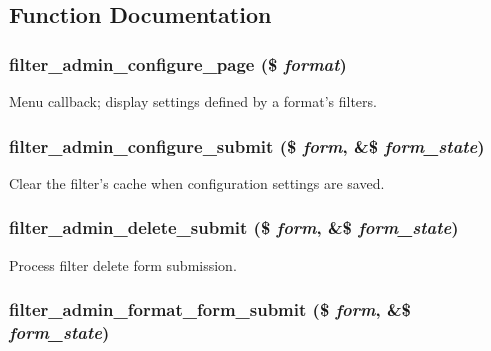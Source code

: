 \subsection{Function Documentation}
\hypertarget{filter_8admin_8inc_73c7cd94e9aa604197745aeda599bf43}{
\subsubsection[{filter\_\-admin\_\-configure\_\-page}]{\setlength{\rightskip}{0pt plus 5cm}filter\_\-admin\_\-configure\_\-page (\$ {\em format})}}
\label{filter_8admin_8inc_73c7cd94e9aa604197745aeda599bf43}


Menu callback; display settings defined by a format's filters. \hypertarget{filter_8admin_8inc_2e8e2b234ba63aab2f16b2dd0313e5f8}{
\subsubsection[{filter\_\-admin\_\-configure\_\-submit}]{\setlength{\rightskip}{0pt plus 5cm}filter\_\-admin\_\-configure\_\-submit (\$ {\em form}, \/  \&\$ {\em form\_\-state})}}
\label{filter_8admin_8inc_2e8e2b234ba63aab2f16b2dd0313e5f8}


Clear the filter's cache when configuration settings are saved. \hypertarget{filter_8admin_8inc_280611f74f59bc785a6fd35fae0ed8d3}{
\subsubsection[{filter\_\-admin\_\-delete\_\-submit}]{\setlength{\rightskip}{0pt plus 5cm}filter\_\-admin\_\-delete\_\-submit (\$ {\em form}, \/  \&\$ {\em form\_\-state})}}
\label{filter_8admin_8inc_280611f74f59bc785a6fd35fae0ed8d3}


Process filter delete form submission. \hypertarget{filter_8admin_8inc_1cabbcac9ccc4de52ea16a64a8c8cd54}{
\subsubsection[{filter\_\-admin\_\-format\_\-form\_\-submit}]{\setlength{\rightskip}{0pt plus 5cm}filter\_\-admin\_\-format\_\-form\_\-submit (\$ {\em form}, \/  \&\$ {\em form\_\-state})}}
\label{filter_8admin_8inc_1cabbcac9ccc4de52ea16a64a8c8cd54}



